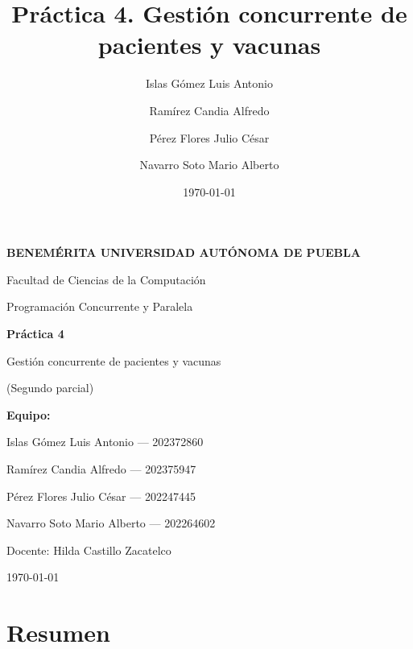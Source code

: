 \documentclass[12pt,letterpaper]{article}
\title{Práctica 4. Gestión concurrente de pacientes y vacunas}
\author{Islas Gómez Luis Antonio \and Ramírez Candia Alfredo \and Pérez Flores Julio César \and Navarro Soto Mario Alberto}
\date{\today}
\begin{document}
\begin{titlepage}
    \centering
    \vspace*{0.5cm}

    {\Large\bfseries BENEMÉRITA UNIVERSIDAD AUTÓNOMA DE PUEBLA\par}
    \vspace{0.4cm}
    {\large Facultad de Ciencias de la Computación\par}
    \vspace{1.2cm}

    {\large Programación Concurrente y Paralela\par}

    \vfill

    {\Huge\bfseries Práctica 4\par}
    \vspace{0.4cm}
    {\LARGE Gestión concurrente de pacientes y vacunas\par}
    \vspace{0.3cm}
    {\large (Segundo parcial)\par}

    \vfill

    {\large\bfseries Equipo:\par}
    \vspace{0.3cm}
    Islas Gómez Luis Antonio --- 202372860\par
    Ramírez Candia Alfredo --- 202375947\par
    Pérez Flores Julio César --- 202247445\par
    Navarro Soto Mario Alberto --- 202264602\par

    \vfill

    {\large Docente: Hilda Castillo Zacatelco\par}
    \vspace{0.6cm}
    {\large \today\par}
\end{titlepage}

\tableofcontents
\newpage

\section{Resumen}
\end{document}
